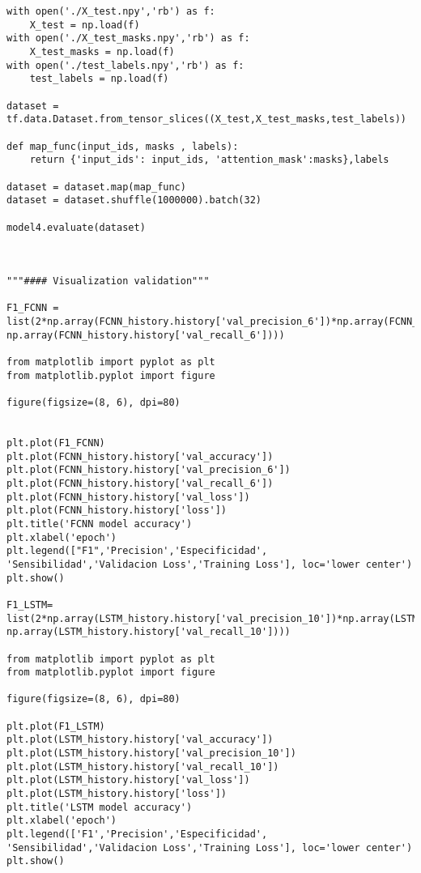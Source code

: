 \documentclass[10pt,riqno,a4paper,twoside]{article}\usepackage[]{graphicx}\usepackage[]{color}
\begin{document}
\begin{lstlisting}
with open('./X_test.npy','rb') as f:
    X_test = np.load(f)
with open('./X_test_masks.npy','rb') as f:
    X_test_masks = np.load(f)
with open('./test_labels.npy','rb') as f:
    test_labels = np.load(f)

dataset = tf.data.Dataset.from_tensor_slices((X_test,X_test_masks,test_labels))

def map_func(input_ids, masks , labels):
    return {'input_ids': input_ids, 'attention_mask':masks},labels

dataset = dataset.map(map_func)
dataset = dataset.shuffle(1000000).batch(32)

model4.evaluate(dataset)



"""#### Visualization validation"""

F1_FCNN = list(2*np.array(FCNN_history.history['val_precision_6'])*np.array(FCNN_history.history['val_recall_6'])/(np.array(FCNN_history.history['val_precision_6'])+ np.array(FCNN_history.history['val_recall_6'])))

from matplotlib import pyplot as plt
from matplotlib.pyplot import figure

figure(figsize=(8, 6), dpi=80)


plt.plot(F1_FCNN)
plt.plot(FCNN_history.history['val_accuracy'])
plt.plot(FCNN_history.history['val_precision_6'])
plt.plot(FCNN_history.history['val_recall_6'])
plt.plot(FCNN_history.history['val_loss'])
plt.plot(FCNN_history.history['loss'])
plt.title('FCNN model accuracy')
plt.xlabel('epoch')
plt.legend(["F1",'Precision','Especificidad', 'Sensibilidad','Validacion Loss','Training Loss'], loc='lower center')
plt.show()

F1_LSTM= list(2*np.array(LSTM_history.history['val_precision_10'])*np.array(LSTM_history.history['val_recall_10'])/(np.array(LSTM_history.history['val_precision_10'])+ np.array(LSTM_history.history['val_recall_10'])))

from matplotlib import pyplot as plt
from matplotlib.pyplot import figure

figure(figsize=(8, 6), dpi=80)

plt.plot(F1_LSTM)
plt.plot(LSTM_history.history['val_accuracy'])
plt.plot(LSTM_history.history['val_precision_10'])
plt.plot(LSTM_history.history['val_recall_10'])
plt.plot(LSTM_history.history['val_loss'])
plt.plot(LSTM_history.history['loss'])
plt.title('LSTM model accuracy')
plt.xlabel('epoch')
plt.legend(['F1','Precision','Especificidad', 'Sensibilidad','Validacion Loss','Training Loss'], loc='lower center')
plt.show()


\end{lstlisting}
\end{document}
